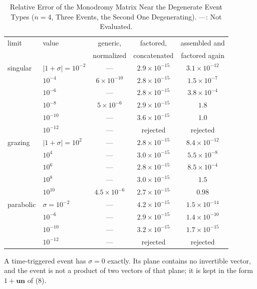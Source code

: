 \documentclass[journal]{IEEEtran}
\begin{document}
\begin{table}[!h]
\caption{Relative Error of the Monodromy Matrix Near the Degenerate Event
Types ($n=4$, Three Events, the Second One Degenerating). ---: Not
Evaluated.}
\label{tab:condic}
\centering
\footnotesize
\setlength{\tabcolsep}{3pt}
\begin{tabular}{@{}llccc@{}}
\toprule
limit & value & generic, & factored, & assembled and \\
 & & normalized & concatenated & factored again \\
\midrule
singular & $\lvert1+\sigma\rvert=10^{-2}$ & --- & $2.9\times10^{-15}$ & $3.1\times10^{-12}$ \\
 & $10^{-4}$ & $6\times10^{-10}$ & $2.8\times10^{-15}$ & $1.5\times10^{-7}$ \\
 & $10^{-6}$ & --- & $2.8\times10^{-15}$ & $3.8\times10^{-4}$ \\
 & $10^{-8}$ & $5\times10^{-6}$ & $2.9\times10^{-15}$ & $1.8$ \\
 & $10^{-10}$ & --- & $3.6\times10^{-15}$ & $1.0$ \\
 & $10^{-12}$ & --- & rejected & rejected \\
\addlinespace[2pt]
grazing & $\lvert1+\sigma\rvert=10^{2}$ & --- & $2.8\times10^{-15}$ & $8.4\times10^{-12}$ \\
 & $10^{4}$ & --- & $3.0\times10^{-15}$ & $5.5\times10^{-8}$ \\
 & $10^{6}$ & --- & $2.8\times10^{-15}$ & $8.5\times10^{-4}$ \\
 & $10^{8}$ & --- & $3.0\times10^{-15}$ & $1.5$ \\
 & $10^{10}$ & $4.5\times10^{-6}$ & $2.7\times10^{-15}$ & $0.98$ \\
\addlinespace[2pt]
parabolic & $\sigma=10^{-2}$ & --- & $4.2\times10^{-15}$ & $1.5\times10^{-14}$ \\
 & $10^{-6}$ & --- & $2.9\times10^{-15}$ & $1.4\times10^{-10}$ \\
 & $10^{-10}$ & --- & $3.2\times10^{-15}$ & $1.7\times10^{-15}$ \\
 & $10^{-12}$ & --- & rejected & rejected \\
\bottomrule
\end{tabular}
\end{table}

A time-triggered event has $\sigma=0$ exactly. Its plane contains no
invertible vector, and the event is not a product of two vectors of that
plane; it is kept in the form $1+\bm{u}\bm{n}$ of (8).
\end{document}
